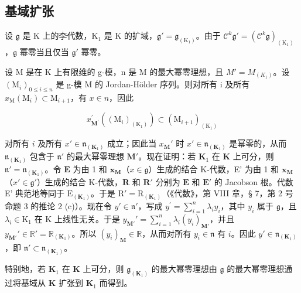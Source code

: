 \subsection{基域扩张}

设 \(\mathfrak{g}\) 是 K 上的李代数，\(\mathrm{K}_1\) 是 K 的扩域，\(\mathfrak{g}' = \mathfrak{g}_{(\mathrm{K}_1)}\)。由于 \(\mathcal{C}^k\mathfrak{g}' = (\mathcal{C}^k\mathfrak{g})_{(\mathrm{K}_1)}\)，\(\mathfrak{g}\) 幂零当且仅当 \(\mathfrak{g}'\) 幂零。

设 M 是在 K 上有限维的 g-模，n 是 M 的最大幂零理想，且 \(M' = M_{(K_1)}\)。设 \((\mathrm{M}_i)_{0 \leq i \leq n}\) 是 g-模 M 的 Jordan-Hölder 序列。则对所有 i 及所有 \(x_{\mathrm{M}}(\mathrm{M}_i) \subset \mathrm{M}_{i+1}\)，有 \(x \in n\)，因此

\[
x _ {\mathbf {M} ^ {\prime}} ^ {\prime} \left(\left(\mathrm{M} _ {i}\right) _ {\left(\mathrm{K} _ {1}\right)}\right) \subset \left(\mathrm{M} _ {i + 1}\right) _ {\left(\mathrm{K} _ {1}\right)}
\]

对所有 \(i\) 及所有 \(x' \in \mathfrak{n}_{(\mathbf{K}_1)}\) 成立；因此当 \(x_{\mathbf{M}}'\) 时 \(x' \in \mathfrak{n}_{(\mathbf{K}_1)}\) 是幂零的，从而 \(\mathfrak{n}_{(\mathbf{K}_1)}\) 包含于 \(\mathfrak{n}'\) 的最大幂零理想 \(\mathbf{M}'\)。现在证明：若 \(\mathbf{K}_1\) 在 \(\mathbf{K}\) 上可分，则 \(\mathfrak{n}' = \mathfrak{n}_{(\mathbf{K}_1)}\)。令 \(\mathbf{E}\) 为由 1 和 \(\mathbf{x}_{\mathbf{M}}\)（\(x \in \mathfrak{g}\)）生成的结合 K-代数，E' 为由 1 和 \(\mathbf{x}_{\mathbf{M}}\)（\(x' \in \mathfrak{g}'\)）生成的结合 K-代数，\(\mathbf{R}\) 和 \(\mathbf{R}'\) 分别为 \(\mathbf{E}\) 和 \(\mathbf{E}'\) 的 Jacobson 根。代数 E' 典范地等同于 \(\mathrm{E}_{(\mathbf{K}_1)}\)。于是 \(\mathrm{R}' = \mathrm{R}_{(\mathbf{K}_1)}\)（《代数》，第 VIII 章，§ 7，第 2 号命题 3 的推论 2 (c)）。现在令 \(y' \in \mathfrak{n}'\)，写成 \(y^{\prime} = \sum_{i = 1}^{n}\lambda_{i}y_{i}\)，其中 \(y_{i}\) 属于 \(\mathfrak{g}\)，且 \(\lambda_{i}\in \mathrm{K}_{1}\) 在 K 上线性无关。于是 \(y_{\mathbf{M}'}' = \sum_{i=1}^{n} \lambda_i(y_i)_{\mathbf{M}'}\)，并且 \(y_{\mathbf{M}'}' \in \mathbb{R}' = \mathbb{R}_{(\mathbf{K}_1)}\)。所以 \((y_i)_{\mathbf{M}} \in \mathbb{R}\)，从而对所有 \(y_i \in \mathfrak{n}\) 有 \(i\)。因此 \(y' \in \mathfrak{n}_{(\mathbf{K}_1)}\)，即 \(\mathfrak{n}' \subset \mathfrak{n}_{(\mathbf{K}_1)}\)。

特别地，若 \(\mathbf{K}_1\) 在 \(\mathbf{K}\) 上可分，则 \(\mathfrak{g}_{(\mathbf{K}_1)}\) 的最大幂零理想由 \(\mathfrak{g}\) 的最大幂零理想通过将基域从 \(\mathbf{K}\) 扩张到 \(\mathbf{K}_1\) 而得到。

